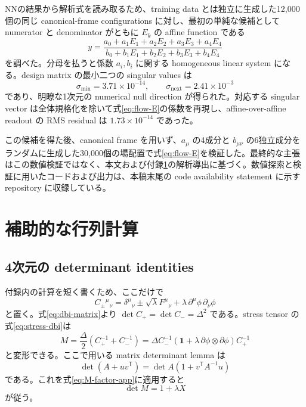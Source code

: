 \documentclass[a4paper,11pt]{ltjsarticle}
\numberwithin{equation}{section}
\newcommand{\Id}{\mathbf 1}
\begin{document}
NNの結果から解析式を読み取るため、training data とは独立に生成した12,000個の同じ canonical-frame configurations に対し、最初の単純な候補として numerator と denominator がともに $E_k$ の affine function である
\begin{equation}
 y=\frac{a_0+a_1E_1+a_2E_2+a_3E_3+a_4E_4}
 {b_0+b_1E_1+b_2E_2+b_3E_3+b_4E_4}
 \label{eq:rational-ansatz}
\end{equation}
を調べた。分母を払うと係数 $a_i,b_i$ に関する homogeneous linear system になる。design matrix の最小二つの singular values は
\begin{equation}
 \sigma_{\min}=3.71\times10^{-14},
 \qquad
 \sigma_{\mathrm{next}}=2.41\times10^{-3}
 \label{eq:svd-gap}
\end{equation}
であり、明瞭な1次元の numerical null direction が得られた。対応する singular vector は全体規格化を除いて式\eqref{eq:flow-E}の係数を再現し、affine-over-affine readout の RMS residual は $1.73\times10^{-14}$ であった。

この候補を得た後、canonical frame を用いず、$a_\mu$ の4成分と $b_{\mu\nu}$ の6独立成分をランダムに生成した30,000個の場配置で式\eqref{eq:flow-E}を検証した。最終的な主張はこの数値検証ではなく、本文および付録\ref{app:matrix-identities}の解析導出に基づく。数値探索と検証に用いたコードおよび出力は、本稿末尾の code availability statement に示す repository に収録している。

\section{補助的な行列計算}
\label{app:matrix-identities}

\subsection{4次元の determinant identities}

付録内の計算を短く書くため、ここだけで
\begin{equation}
 C_\pm{}^\mu{}_{\nu}
 =\delta^\mu{}_{\nu}\pm\sqrt\lambda F^\mu{}_{\nu}
 +\lambda\,\partial^\mu\phi\,\partial_\nu\phi
 \label{eq:Cpm-app}
\end{equation}
と置く。式\eqref{eq:dbi-matrix}より $\det C_+=\det C_-=\Delta^2$ である。stress tensor の式\eqref{eq:stress-dbi}は
\begin{equation}
 M=\frac\Delta2(C_+^{-1}+C_-^{-1})
 =\Delta C_-^{-1}\left(\Id+\lambda\,\partial\phi\otimes\partial\phi\right)C_+^{-1}
 \label{eq:M-factor-app}
\end{equation}
と変形できる。ここで用いる matrix determinant lemma は
\begin{equation}
 \det(A+uv^{\mathsf T})=\det A\left(1+v^{\mathsf T}A^{-1}u\right)
 \label{eq:detlemma-app}
\end{equation}
である。これを式\eqref{eq:M-factor-app}に適用すると
\begin{equation}
 \det M=1+\lambda X
\end{equation}
が従う。
\end{document}

